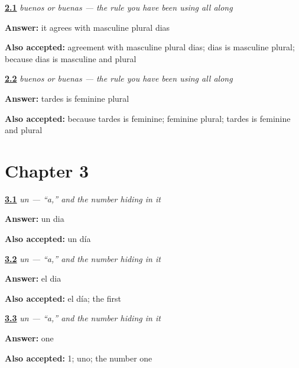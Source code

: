 \noindent\begin{minipage}[t]{\linewidth}
\raggedright
\hyperlink{review-ES-C02-concordancia-why-buenos}{\textbf{2.1}} \emph{buenos or buenas — the rule you have been using all along}\par
\small \textbf{Answer:} it agrees with masculine plural dias\par
\footnotesize \textbf{Also accepted:} agreement with masculine plural dias; dias is masculine plural; because dias is masculine and plural
\end{minipage}\par\medskip

\noindent\begin{minipage}[t]{\linewidth}
\raggedright
\hyperlink{review-ES-C02-concordancia-why-buenas}{\textbf{2.2}} \emph{buenos or buenas — the rule you have been using all along}\par
\small \textbf{Answer:} tardes is feminine plural\par
\footnotesize \textbf{Also accepted:} because tardes is feminine; feminine plural; tardes is feminine and plural
\end{minipage}\par\medskip

\section*{Chapter 3}

\noindent\begin{minipage}[t]{\linewidth}
\raggedright
\hyperlink{review-ES-C02-un-form}{\textbf{3.1}} \emph{un — \textquotedblleft{}a,\textquotedblright{} and the number hiding in it}\par
\small \textbf{Answer:} un dia\par
\footnotesize \textbf{Also accepted:} un día
\end{minipage}\par\medskip

\noindent\begin{minipage}[t]{\linewidth}
\raggedright
\hyperlink{review-ES-C02-un-contrast}{\textbf{3.2}} \emph{un — \textquotedblleft{}a,\textquotedblright{} and the number hiding in it}\par
\small \textbf{Answer:} el dia\par
\footnotesize \textbf{Also accepted:} el día; the first
\end{minipage}\par\medskip

\noindent\begin{minipage}[t]{\linewidth}
\raggedright
\hyperlink{review-ES-C02-un-number}{\textbf{3.3}} \emph{un — \textquotedblleft{}a,\textquotedblright{} and the number hiding in it}\par
\small \textbf{Answer:} one\par
\footnotesize \textbf{Also accepted:} 1; uno; the number one
\end{minipage}\par\medskip

